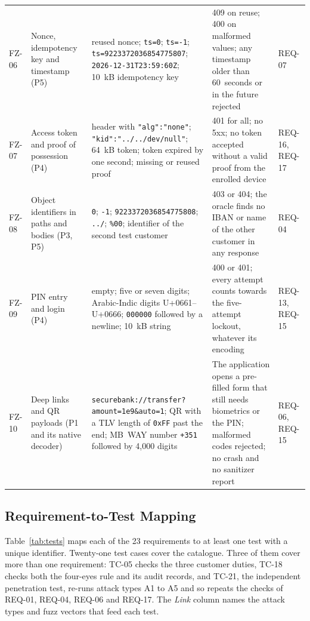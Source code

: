 \begin{table}[!t]
\begin{tabularx}{\textwidth}{@{}L{0.8cm}L{2.6cm}L{5.0cm}YL{1.3cm}@{}}
FZ-06 & Nonce, idempotency key and timestamp (P5) & reused nonce; \texttt{ts=0}; \texttt{ts=-1}; \texttt{ts=9223372036854775807}; \texttt{2026-12-31T23:59:60Z}; 10~kB idempotency key & 409 on reuse; 400 on malformed values; any timestamp older than 60~seconds or in the future rejected & REQ-07 \\
FZ-07 & Access token and proof of possession (P4) & header with \texttt{"alg":"none"}; \texttt{"kid":"../../dev/null"}; 64~kB token; token expired by one second; missing or reused proof & 401 for all; no 5xx; no token accepted without a valid proof from the enrolled device & REQ-16, REQ-17 \\
FZ-08 & Object identifiers in paths and bodies (P3, P5) & \texttt{0}; \texttt{-1}; \texttt{9223372036854775808}; \texttt{../}; \texttt{\%00}; identifier of the second test customer & 403 or 404; the oracle finds no IBAN or name of the other customer in any response & REQ-04 \\
FZ-09 & \ac{PIN} entry and login (P4) & empty; five or seven digits; Arabic-Indic digits U+0661--U+0666; \texttt{000000} followed by a newline; 10~kB string & 400 or 401; every attempt counts towards the five-attempt lockout, whatever its encoding & REQ-13, REQ-15 \\
FZ-10 & Deep links and QR payloads (P1 and its native decoder) & \texttt{securebank://transfer?}\allowbreak\texttt{amount=1e9\&auto=1}; QR with a TLV length of \texttt{0xFF} past the end; MB~WAY number \texttt{+351} followed by 4{,}000 digits & The application opens a pre-filled form that still needs biometrics or the \ac{PIN}; malformed codes rejected; no crash and no sanitizer report & REQ-06, REQ-15 \\
\bottomrule
\end{tabularx}
\end{table}

\subsection{Requirement-to-Test Mapping}

Table~\ref{tab:tests} maps each of the 23 requirements to at least one
test with a unique identifier. Twenty-one test cases cover the catalogue.
Three of them cover more than one requirement: TC-05 checks the three
customer duties, TC-18 checks both the four-eyes rule and its audit
records, and TC-21, the independent penetration test, re-runs attack
types A1 to A5 and so repeats the checks of \mbox{REQ-01}, \mbox{REQ-04},
\mbox{REQ-06} and \mbox{REQ-17}. The \emph{Link} column names the attack
types and fuzz vectors that feed each test.

